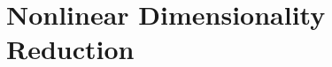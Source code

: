 \chapter{Nonlinear Dimensionality Reduction}
\begin{refsection}
%
\printbibliography[heading=subbibliography]
\end{refsection}